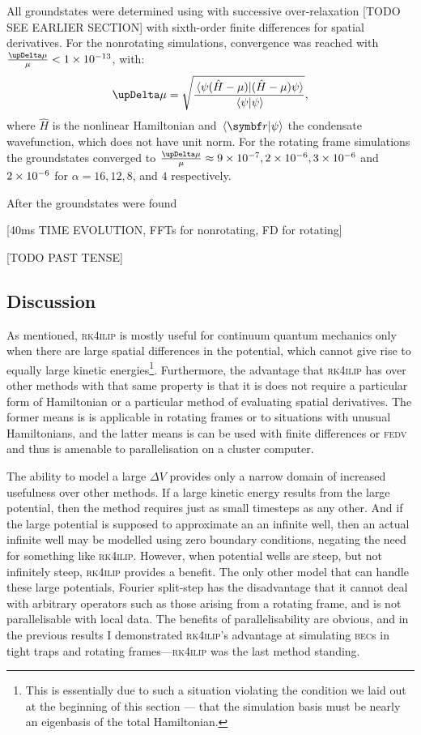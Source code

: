All groundstates were determined using with successive over-relaxation [TODO SEE EARLIER SECTION] with sixth-order finite differences for spatial derivatives. For the nonrotating simulations, convergence was reached with $\frac{\upDelta\mu}{\mu} < 1\E{-13}$, with:
\begin{equation}
\upDelta\mu = \sqrt{\frac{\braket{\psi(\hat H - \mu)} {(\hat H - \mu)\psi}}{\braket {\psi}{\psi}}},
\end{equation}
where $\hat H$ is the nonlinear Hamiltonian and $\braket{\vec r}{\psi}$ the condensate wavefunction, which does not have unit norm. For the rotating frame simulations the groundstates converged to $\frac{\upDelta\mu}{\mu} \approx 9\E{-7}, 2\E{-6}, 3\E{-6}$ and $2\times 10^{-6}$ for $\alpha = 16, 12, 8$, and $4$ respectively.

After the groundstates were found

[40ms TIME EVOLUTION, FFTs for nonrotating, FD for rotating]

[TODO PAST TENSE]

\subsection{Discussion}

As mentioned, \textsc{rk4ilip} is mostly useful for continuum quantum mechanics only when there are large spatial differences in the potential, which cannot give rise to equally large kinetic energies\footnote{This is essentially due to such a situation violating the condition we laid out at the beginning of this section --- that the simulation basis must be nearly an eigenbasis of the total Hamiltonian.}. Furthermore, the advantage that \textsc{rk4ilip} has over other methods with that same property is that it is does not require a particular form of Hamiltonian or a particular method of evaluating spatial derivatives. The former means is is applicable in rotating frames or to situations with unusual Hamiltonians, and the latter means is can be used with finite differences or \textsc{fedv} and thus is amenable to parallelisation on a cluster computer.

The ability to model a large $\Delta V$ provides only a narrow domain of increased usefulness over other methods. If a large kinetic energy results from the large potential, then the method requires just as small timesteps as any other. And if the large potential is supposed to approximate an an infinite well, then an actual infinite well may be modelled using zero boundary conditions, negating the need for something like \textsc{rk4ilip}. However, when potential wells are steep, but not infinitely steep, \textsc{rk4ilip} provides a benefit. The only other model that can handle these large potentials, Fourier split-step has the disadvantage that it cannot deal with arbitrary operators such as those arising from a rotating frame, and is not parallelisable with local data. The benefits of parallelisability are obvious, and in the previous results I demonstrated \textsc{rk4ilip}'s advantage at simulating \textsc{bec}s in tight traps and rotating frames---\textsc{rk4ilip} was the last method standing.
